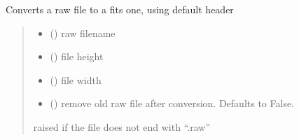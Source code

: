 \documentclass[letterpaper,10pt,english]{sphinxmanual}
\begin{document}

\begin{fulllineitems}
\label{\detokenize{micropolarray.processing:micropolarray.processing.convert.convert_rawfile_to_fits}}
\pysigstartsignatures
{}
\pysigstopsignatures
\sphinxAtStartPar
Converts a raw file to a fits one, using default header
\begin{quote}\begin{description}
\begin{itemize}
\item {} 
\sphinxAtStartPar
{} () \textendash{} raw filename

\item {} 
\sphinxAtStartPar
{} () \textendash{} file height

\item {} 
\sphinxAtStartPar
{} () \textendash{} file width

\item {} 
\sphinxAtStartPar
{} (\sphinxstyleliteralemphasis{\sphinxupquote{, }}) \textendash{} remove old raw file after conversion. Defaults to False.

\end{itemize}

\sphinxAtStartPar
{} \textendash{} raised if the file does not end with “.raw”

\end{description}\end{quote}

\end{fulllineitems}
\end{document}
